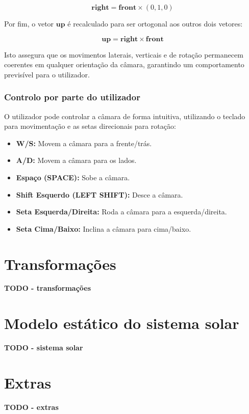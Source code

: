 \documentclass[12pt, a4paper]{article}
\begin{document}
\[
\mathbf{right} = \mathbf{front} \times (0,1,0)
\]

Por fim, o vetor $\mathbf{up}$ é recalculado para ser ortogonal aos outros dois vetores:

\[
\mathbf{up} = \mathbf{right} \times \mathbf{front}
\]

Isto assegura que os movimentos laterais, verticais e de rotação permanecem coerentes em
qualquer orientação da câmara, garantindo um comportamento previsível para o utilizador.

\subsubsection{Controlo por parte do utilizador}

O utilizador pode controlar a câmara de forma intuitiva, utilizando o teclado para movimentação
e as setas direcionais para rotação:

\begin{itemize}
    \item \textbf{W/S:} Movem a câmara para a frente/trás.
    \item \textbf{A/D:} Movem a câmara para os lados.
    \item \textbf{Espaço (SPACE):} Sobe a câmara.
    \item \textbf{Shift Esquerdo (LEFT SHIFT):} Desce a câmara.
    \item \textbf{Seta Esquerda/Direita:} Roda a câmara para a esquerda/direita.
    \item \textbf{Seta Cima/Baixo:} Inclina a câmara para cima/baixo.
\end{itemize}

\section{Transformações}

\textbf{\color{red} TODO - transformações}

\section{Modelo estático do sistema solar}

\textbf{\color{red} TODO - sistema solar}

\section{Extras}

\textbf{\color{red} TODO - extras}
\end{document}
